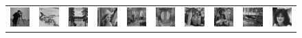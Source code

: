 \documentclass[al, 27pt, plainboxedsections, landscape]{sciposter}
\begin{document}
\begin{multicols}{3}
\begin{figure}[!t]
\centering
{\renewcommand{\arraystretch}{0.7}
\setlength{\tabcolsep}{0.1em}
\begin{tabular}{cccccccccc}
  \includegraphics[width=0.095\linewidth]{images/classic512_1001}  & \includegraphics[width=0.095\linewidth]{images/classic512_1002} &
  \includegraphics[width=0.095\linewidth]{images/classic512_1003} & \includegraphics[width=0.095\linewidth]{images/classic512_1004} &
  \includegraphics[width=0.095\linewidth]{images/classic512_1005} &
  \includegraphics[width=0.095\linewidth]{images/classic512_1006}  & \includegraphics[width=0.095\linewidth]{images/classic512_1007} &
  \includegraphics[width=0.095\linewidth]{images/classic512_1008} & \includegraphics[width=0.095\linewidth]{images/classic512_1009} &
  \includegraphics[width=0.095\linewidth]{images/classic512_1010} \\  

\end{tabular}}
\end{figure}
\end{multicols}
\end{document}
